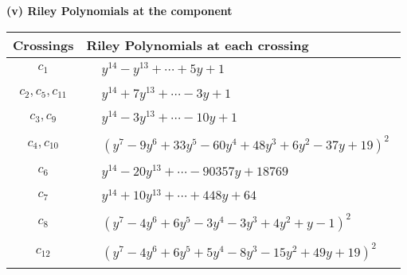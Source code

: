 \documentclass[1p]{elsarticle_modified}
\theoremstyle{definition}
\begin{document}
\newpage\renewcommand{\arraystretch}{1}
\flushleft \textbf{(v) Riley Polynomials at the component}\newline \\
\begin{tabular}{m{50pt}|m{274pt}}
Crossings & \hspace{64pt}Riley Polynomials at each crossing \\
\hline $$\begin{aligned}c_{1}\end{aligned}$$&$\begin{aligned}
&y^{14}- y^{13}+\cdots+5 y+1
\end{aligned}$\\
\hline $$\begin{aligned}c_{2},c_{5},c_{11}\end{aligned}$$&$\begin{aligned}
&y^{14}+7 y^{13}+\cdots-3 y+1
\end{aligned}$\\
\hline $$\begin{aligned}c_{3},c_{9}\end{aligned}$$&$\begin{aligned}
&y^{14}-3 y^{13}+\cdots-10 y+1
\end{aligned}$\\
\hline $$\begin{aligned}c_{4},c_{10}\end{aligned}$$&$\begin{aligned}
&(y^7-9 y^6+33 y^5-60 y^4+48 y^3+6 y^2-37 y+19)^2
\end{aligned}$\\
\hline $$\begin{aligned}c_{6}\end{aligned}$$&$\begin{aligned}
&y^{14}-20 y^{13}+\cdots-90357 y+18769
\end{aligned}$\\
\hline $$\begin{aligned}c_{7}\end{aligned}$$&$\begin{aligned}
&y^{14}+10 y^{13}+\cdots+448 y+64
\end{aligned}$\\
\hline $$\begin{aligned}c_{8}\end{aligned}$$&$\begin{aligned}
&(y^7-4 y^6+6 y^5-3 y^4-3 y^3+4 y^2+y-1)^2
\end{aligned}$\\
\hline $$\begin{aligned}c_{12}\end{aligned}$$&$\begin{aligned}
&(y^7-4 y^6+6 y^5+5 y^4-8 y^3-15 y^2+49 y+19)^2
\end{aligned}$\\
\hline
\end{tabular}\\~\\
\end{document}
